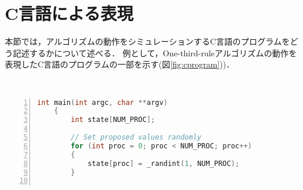 \documentclass[technicalreport]{ieicej}
\theoremstyle{plain}
\begin{document}


\section{C言語による表現}\label{sec:clang}

本節では，アルゴリズムの動作をシミュレーションするC言語のプログラムをどう記述するかについて述べる．
例として，One-third-ruleアルゴリズムの動作を表現したC言語のプログラムの一部を示す(図\ref{fig:cprogram}))．


\begin{figure*}
	\centering　
	\begin{minipage}{0.8\textwidth}
	{\scriptsize
\begin{lstlisting}[language=c,numbers=left]
    int main(int argc, char **argv)
    {
        int state[NUM_PROC];
                
        // Set proposed values randomly
        for (int proc = 0; proc < NUM_PROC; proc++)
        {
            state[proc] = _randint(1, NUM_PROC);
        }
        

\end{lstlisting}}
\end{minipage}
\end{figure*}
\end{document}
